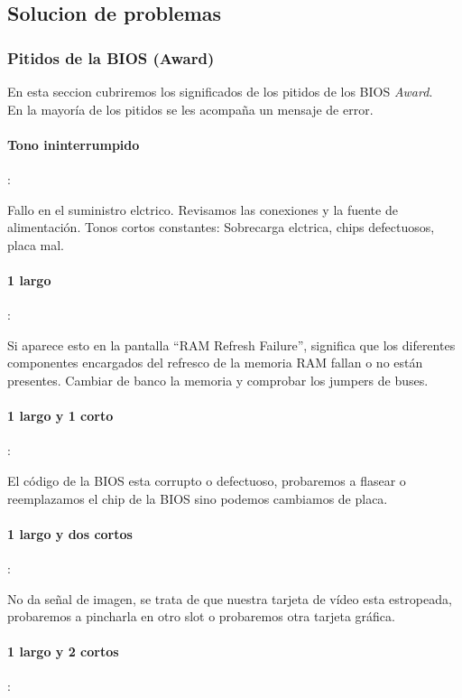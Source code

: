 \documentclass[12pt,oneside,a4paper]{article}
\begin{document}
	\subsection{Solucion de problemas}{\label{sec:bios/solcion-de-problemas}}
		\subsubsection{Pitidos de la BIOS (Award)}{\label{sec:bios/tonos-de-la-bios}}

		En esta seccion cubriremos los significados de los pitidos de los BIOS {\em Award}. \\
		En la mayoría de los pitidos se les acompaña un mensaje de error. 

			\paragraph{Tono ininterrumpido}:
			
			Fallo en el suministro elctrico. Revisamos las conexiones y la fuente
			de alimentación.  Tonos cortos constantes: Sobrecarga elctrica, chips
			defectuosos, placa mal.

			\paragraph{1 largo}:

			Si aparece esto en la pantalla “RAM Refresh Failure”, significa que los
			diferentes componentes encargados del refresco de la memoria RAM fallan
			o no están presentes. Cambiar de banco la memoria y comprobar los
			jumpers de buses. 

			\paragraph{1 largo y 1 corto}: 

			El código de la BIOS esta corrupto o defectuoso, probaremos a flasear o
			reemplazamos el chip de la BIOS sino podemos cambiamos de placa. 

			\paragraph{1 largo y dos cortos}:
			
			No da señal de imagen, se trata de que nuestra tarjeta de vídeo esta
			estropeada, probaremos a pincharla en otro slot o probaremos otra
			tarjeta gráfica. 

			\paragraph{1 largo y 2 cortos}:
\end{document}
